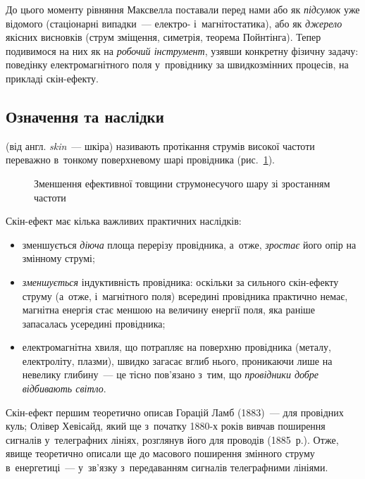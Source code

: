 До цього моменту рівняння Максвелла поставали перед нами або як \emph{підсумок} уже
відомого (стаціонарні випадки~--- електро- і~магнітостатика), або як \emph{джерело}
якісних висновків (струм зміщення, симетрія, теорема Пойнтінга). Тепер подивимося на них
як на \emph{робочий інструмент}, узявши конкретну фізичну задачу: поведінку
електромагнітного поля у~провіднику за швидкозмінних процесів, на прикладі скін-ефекту.


\subsection*{Означення та наслідки}


 (від англ. \emph{skin}~--- шкіра) називають протікання струмів
високої частоти переважно в~тонкому поверхневому шарі провідника
(рис.~\ref{pic:SkinIllustration}).

\begin{figure}[h!]\centering
	\caption{Зменшення ефективної товщини струмонесучого шару зі зростанням
	частоти\label{pic:SkinIllustration}}
\end{figure}

Скін-ефект має кілька важливих практичних наслідків:
\begin{itemize}
	\item зменшується \emph{діюча} площа перерізу провідника, а~отже, \emph{зростає}
	  його опір на змінному струмі;
	\item \emph{зменшується} індуктивність провідника: оскільки за сильного скін-ефекту
	  струму (а~отже, і~магнітного поля) всередині провідника практично немає, магнітна
	  енергія стає меншою на величину енергії поля, яка раніше запасалась усередині
	  провідника;
	\item електромагнітна хвиля, що потрапляє на поверхню провідника (металу, електроліту,
	  плазми), швидко загасає вглиб нього, проникаючи лише на невелику глибину~--- це
	  тісно пов'язано з~тим, що \emph{провідники добре відбивають світло}.
\end{itemize}

\begin{Historical}
	Скін-ефект першим теоретично описав Горацій Ламб (1883)~--- для провідних куль; Олівер
	Хевісайд, який ще з~початку 1880-х років вивчав поширення сигналів у~телеграфних
	лініях, розглянув його для проводів (1885~р.). Отже, явище теоретично описали ще до
	масового поширення змінного струму в~енергетиці~--- у~зв'язку з~передаванням сигналів
	телеграфними лініями.
\end{Historical}


